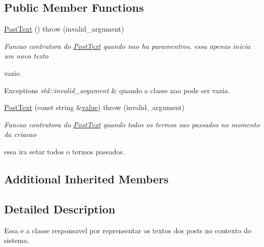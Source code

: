 \subsection*{Public Member Functions}
\begin{DoxyCompactItemize}
\item 
\hypertarget{class_post_text_a672716044419f6fa2e21d07f918536e4}{\hyperlink{class_post_text_a672716044419f6fa2e21d07f918536e4}{Post\-Text} ()  throw (invalid\-\_\-argument)}\label{class_post_text_a672716044419f6fa2e21d07f918536e4}

\begin{DoxyCompactList}\small\item\em Funcao contrutora do \hyperlink{class_post_text}{Post\-Text} quando nao ha paramentros, essa apenas inicia um novo texto \par
 vazio 
\begin{DoxyExceptions}{Exceptions}
{\em std\-::invalid\-\_\-argument} & quando a classe nao pode ser vazia. \\
\hline
\end{DoxyExceptions}
\end{DoxyCompactList}\item 
\hyperlink{class_post_text_afff5fc870b1949003a238afe0d23b9bf}{Post\-Text} (const string \&\hyperlink{class_basic_type_af9b2c5cc32647df01083a6802e913dbf}{value})  throw (invalid\-\_\-argument)
\begin{DoxyCompactList}\small\item\em Funcao contrutora do \hyperlink{class_post_text}{Post\-Text} quando todos os termos sao passados no momento da criacao \par
 essa ira setar todos o termos passados. \end{DoxyCompactList}\end{DoxyCompactItemize}
\subsection*{Additional Inherited Members}


\subsection{Detailed Description}
Essa e a classe responsavel por reprensentar os textos dos posts no contexto do sistema. 


